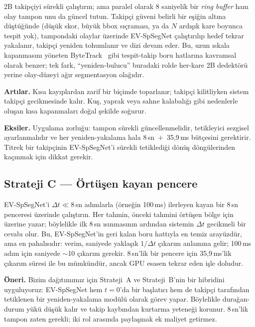 \documentclass[11pt,a4paper]{article}
\begin{document}
2B takip\c{c}iyi s\"urekli \c{c}al{\i}\c{s}t{\i}r{\i}n; ama paralel
olarak 8 saniyelik bir \emph{ring buffer} ham olay tampon\hskip0pt unu
da g\"uncel tutun. Takip\c{c}i g\"uveni belirli bir e\c{s}i\u{g}in
alt{\i}na d\"u\c{s}t\"u\u{g}\"unde (d\"u\c{s}\"uk skor, b\"uy\"uk
bbox s{\i}\c{c}ramas{\i}, ya da $N$ ard{\i}\c{s}{\i}k kare boyunca
tespit yok), tampondaki olaylar \"uzerinde EV-SpSegNet
\c{c}al{\i}\c{s}t{\i}r{\i}l{\i}p hedef tekrar yakalan{\i}r,
takip\c{c}i yeniden tohumlan{\i}r ve dizi devam eder. Bu, uzun
{\i}skala kapanmas{\i}n{\i} y\"oneten
ByteTrack~\cite{zhang2022bytetrack} gibi tespit-takip boru
hatlar{\i}na kavramsal olarak benzer; tek fark, ``yeniden-bulucu''
buradaki rolde her-kare 2B dedekt\"or\"u yerine olay-d\"uzeyi
a\u{g}{\i}r segmentasyon ola\u{g}{\i}d{\i}r.

\textbf{Art{\i}lar.} K{\i}sa kay{\i}plardan zarif bir bi\c{c}imde
toparlan{\i}r; takip\c{c}i kilitliyken sistem takip\c{c}i
gecikmesinde kal{\i}r. Ku\c{s}, yaprak veya sahne kalabal{\i}\u{g}{\i}
gibi nedenlerle olu\c{s}an k{\i}sa kapanmalar{\i} do\u{g}al
\c{s}ekilde so\u{g}urur.

\textbf{Eksiler.} Uygulama zorlu\u{g}u: tampon s\"urekli
g\"uncellenmelidir, tetikleyici sezgisel ayarlanmal{\i}d{\i}r ve
her yeniden-yakalama hala 8\,sn~$+$~35{,}9\,ms b\"ut\c{c}esini
gerektirir. Titrek bir takip\c{c}inin EV-SpSegNet'i s\"urekli
tetikledi\u{g}i d\"on\"u\c{s} d\"ong\"ulerinden ka\c{c}{\i}nmak
i\c{c}in dikkat gerekir.

\subsection{Strateji C --- \"Ort\"u\c{s}en kayan pencere}

EV-SpSegNet'i $\Delta t \ll 8$\,sn ad{\i}mlarla (\"orne\u{g}in 100\,ms)
ilerleyen kayan bir 8\,sn penceresi \"uzerinde \c{c}al{\i}\c{s}t{\i}r{\i}n.
Her tahmin, \"onceki tahmini \"ort\"u\c{s}en b\"olge i\c{c}in
\"uzerine yazar; b\"oylelikle ilk 8\,sn {\i}s{\i}nmas{\i}n{\i}n
ard{\i}ndan sistemin $\Delta t$ gecikmeli bir cevab{\i} olur. Bu,
EV-SpSegNet'in geri kalan boru hatt{\i}yla en temiz aray\"uzd\"ur,
ama en pahal{\i}s{\i}d{\i}r: verim, saniyede yakla\c{s}{\i}k
$1/\Delta t$ \c{c}{\i}kar{\i}m anlam{\i}na gelir; 100\,ms ad{\i}m
i\c{c}in saniyede $\sim$10 \c{c}{\i}kar{\i}m gerekir. 8\,sn'lik bir
pencere i\c{c}in 35{,}9\,ms'lik \c{c}{\i}kar{\i}m s\"uresi ile bu
m\"umk\"und\"ur, ancak GPU esasen tekrar eden i\c{s}le doludur.

\textbf{\"Oneri.} Bizim da\u{g}{\i}t{\i}m{\i}m{\i}z i\c{c}in
Strateji~A ve Strateji~B'nin bir hibridini uyguluyoruz: EV-SpSegNet
hem $t = 0$'da bir ba\c{s}lat{\i}c{\i} hem de takip\c{c}i taraf{\i}ndan
tetiklenen bir yeniden-yakalama mod\"ul\"u olarak g\"orev yapar.
B\"oylelikle dura\u{g}an-durum y\"uk\"u d\"u\c{s}\"uk kal{\i}r ve takip
kayb{\i}ndan kurtarma yetene\u{g}i korunur. 8\,sn'lik tampon zaten
gerekli; iki rol aras{\i}nda payla\c{s}mak ek maliyet getirmez.
\end{document}
